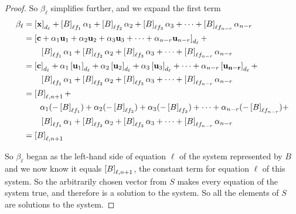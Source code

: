 \documentclass{ximera}
\begin{document}
\begin{theorem}
\begin{proof}
    So $\beta_\ell$ simplifies further, and we expand the first term
    \begin{align*}
      \beta_\ell
      &=
        \left\lbrack\mathbf{x}\right\rbrack_{d_{\ell}}+
        \left\lbrack B\right\rbrack_{\ell f_1}\alpha_1+
        \left\lbrack B\right\rbrack_{\ell f_2}\alpha_2+
        \left\lbrack B\right\rbrack_{\ell f_3}\alpha_3+
        \cdots+
        \left\lbrack B\right\rbrack_{\ell f_{n-r}}\alpha_{n-r}\\
      &=
        \left\lbrack
        \mathbf{c}+
        \alpha_1\mathbf{u}_1+
        \alpha_2\mathbf{u}_2+
        \alpha_3\mathbf{u}_3+
        \cdots+
        \alpha_{n-r}\mathbf{u}_{n-r}
        \right\rbrack_{d_{\ell}}
        +\\
      &\quad\quad
        \left\lbrack B\right\rbrack_{\ell f_1}\alpha_1+
        \left\lbrack B\right\rbrack_{\ell f_2}\alpha_2+
        \left\lbrack B\right\rbrack_{\ell f_3}\alpha_3+
        \cdots+
        \left\lbrack B\right\rbrack_{\ell f_{n-r}}\alpha_{n-r}\\
      &=
        \left\lbrack\mathbf{c}\right\rbrack_{d_{\ell}}+
        \alpha_1\left\lbrack\mathbf{u}_1\right\rbrack_{d_{\ell}}+
        \alpha_2\left\lbrack\mathbf{u}_2\right\rbrack_{d_{\ell}}+
        \alpha_3\left\lbrack\mathbf{u}_3\right\rbrack_{d_{\ell}}+
        \cdots+
        \alpha_{n-r}\left\lbrack\mathbf{u_{n-r}}\right\rbrack_{d_{\ell}}
        +\\
      &\quad\quad
        \left\lbrack B\right\rbrack_{\ell f_1}\alpha_1+
        \left\lbrack B\right\rbrack_{\ell f_2}\alpha_2+
        \left\lbrack B\right\rbrack_{\ell f_3}\alpha_3+
        \cdots+
        \left\lbrack B\right\rbrack_{\ell f_{n-r}}\alpha_{n-r}\\
      &=
        \left\lbrack B\right\rbrack_{\ell,{n+1}}+\\
      &\quad\quad
        \alpha_1(-\left\lbrack B\right\rbrack_{\ell f_1})+
        \alpha_2(-\left\lbrack B\right\rbrack_{\ell f_2})+
        \alpha_3(-\left\lbrack B\right\rbrack_{\ell f_3})+
        \cdots+
        \alpha_{n-r}(-\left\lbrack B\right\rbrack_{\ell f_{n-r}})
        +\\
      &\quad\quad
        \left\lbrack B\right\rbrack_{\ell f_1}\alpha_1+
        \left\lbrack B\right\rbrack_{\ell f_2}\alpha_2+
        \left\lbrack B\right\rbrack_{\ell f_3}\alpha_3+
        \cdots+
        \left\lbrack B\right\rbrack_{\ell f_{n-r}}\alpha_{n-r}\\
      &=
        \left\lbrack B\right\rbrack_{\ell,{n+1}}
    \end{align*}

    So $\beta_\ell$ began as the left-hand side of equation $\ell$ of
    the system represented by $B$ and we now know it equals
    $\left\lbrack B\right\rbrack_{\ell,{n+1}}$, the constant term for equation
    $\ell$ of this system.  So the arbitrarily chosen vector from $S$
    makes every equation of the system true, and therefore is a
    solution to the system.  So all the elements of $S$ are solutions
    to the system.


\end{proof}
\end{theorem}
\end{document}
